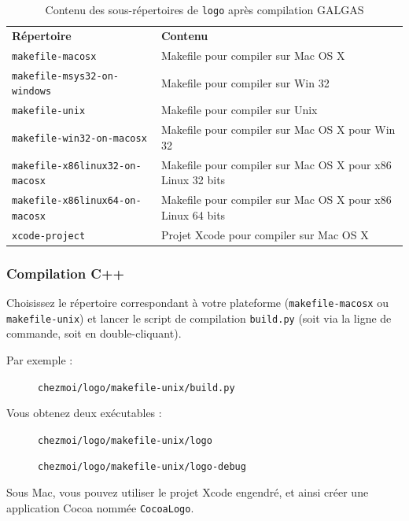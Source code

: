 \begin{table}[t]
  \centering
  \begin{tabular}{ll}
    \textbf{Répertoire} & \textbf{Contenu} \\
    \texttt{makefile-macosx} & Makefile pour compiler sur Mac OS X \\
    \texttt{makefile-msys32-on-windows} & Makefile pour compiler sur Win 32 \\
    \texttt{makefile-unix} & Makefile pour compiler sur Unix \\
    \texttt{makefile-win32-on-macosx} & Makefile pour compiler sur Mac OS X pour Win 32 \\
    \texttt{makefile-x86linux32-on-macosx} & Makefile pour compiler sur Mac OS X pour x86 Linux 32 bits \\
    \texttt{makefile-x86linux64-on-macosx} & Makefile pour compiler sur Mac OS X pour x86 Linux 64 bits \\
    \texttt{xcode-project} & Projet Xcode pour compiler sur Mac OS X
  \end{tabular}
  \caption{Contenu des sous-répertoires de \texttt{logo} après compilation GALGAS}
  \ligne
\end{table}



\subsubsection{Compilation C++}
Choisissez le répertoire correspondant à votre plateforme (\texttt{makefile-macosx} ou \texttt{makefile-unix}) et lancer le script de compilation \texttt{build.py} (soit via la ligne de commande, soit en double-cliquant).

Par exemple :
\begin{description}
  \item[ ] \texttt{chezmoi/logo/makefile-unix/build.py}
\end{description}

Vous obtenez deux exécutables :
\begin{description}
  \item[ ] \texttt{chezmoi/logo/makefile-unix/logo}
  \item[ ] \texttt{chezmoi/logo/makefile-unix/logo-debug}
\end{description}

Sous Mac, vous pouvez utiliser le projet Xcode engendré, et ainsi créer une application Cocoa nommée \texttt{CocoaLogo}.

